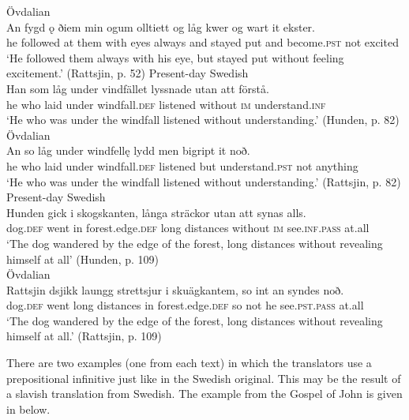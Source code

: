 \documentclass[output=paper]{langscibook}
\begin{document}
\ex Övdalian\label{ex:kalm:23b}\\ 
\gll An fygd ǫ ðiem min ogum olltiett og låg kwer og wart it ekster.\\
he followed at them with eyes always and stayed put and become.\textsc{pst} not excited\\
\glt ‘He followed them always with his eye, but stayed put without feeling excitement.’ (Rattsjin, p. 52)
\z 
\ex
\label{ex:kalm:24}
\ea Present-day Swedish\label{ex:kalm:24a}\\
\gll Han som låg under vindfället lyssnade utan att förstå.\\
he who laid under windfall.\textsc{def} listened without \textsc{im} understand.\textsc{inf}\\
\glt ‘He who was under the windfall listened without understanding.’ (Hunden, p. 82)\\
\ex Övdalian\label{ex:kalm:24b}\\ 
\gll An so låg under windfellę lydd men bigript it noð.\\
he who laid under windfall.\textsc{def} listened but understand.\textsc{pst} not anything\\
\glt ‘He who was under the windfall listened without understanding.’ (Rattsjin, p. 82)
\z 
\ex
\label{ex:kalm:25}
\ea Present-day Swedish\label{ex:kalm:25a}\\
\gll Hunden gick i skogskanten, långa sträckor utan att synas alls.\\
dog.\textsc{def} went in forest.edge.\textsc{def} long distances without \textsc{im} see.\textsc{inf.pass} at.all\\
\glt ‘The dog wandered by the edge of the forest, long distances without revealing himself at all’ (Hunden, p. 109)\\
\ex Övdalian\label{ex:kalm:25b}\\ 
\gll Rattsjin dsjikk laungg strettsjur i skuägkantem, so int an syndes noð.\\
dog.\textsc{def} went long distances in forest.edge.\textsc{def} so not he see.\textsc{pst.pass} at.all\\
\glt ‘The dog wandered by the edge of the forest, long distances without revealing himself at all.’ (Rattsjin, p. 109)
\z 
\z 


There are two examples (one from each text) in which the translators use a prepositional infinitive just like in the Swedish original. This may be the result of a slavish translation from Swedish. The example from the Gospel of John is given in  below. 
\end{document}
